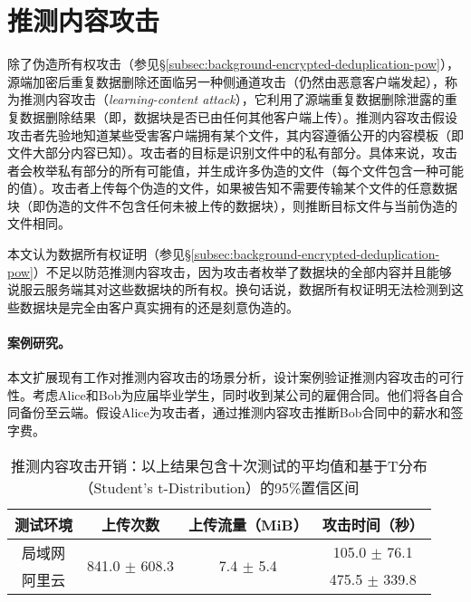 \section{推测内容攻击}
\label{sec:featurespy-attack}

除了伪造所有权攻击（参见\S\ref{subsec:background-encrypted-deduplication-pow}），源端加密后重复数据删除还面临另一种侧通道攻击（仍然由恶意客户端发起），称为推测内容攻击（{\em learning-content attack}）\cite{harnik2010side, zuo2018mitigating}，它利用了源端重复数据删除泄露的重复数据删除结果（即，数据块是否已由任何其他客户端上传）。推测内容攻击假设攻击者先验地知道某些受害客户端拥有某个文件，其内容遵循公开的内容模板（即文件大部分内容已知）。攻击者的目标是识别文件中的私有部分。具体来说，攻击者会枚举私有部分的所有可能值，并生成许多伪造的文件（每个文件包含一种可能的值）。攻击者上传每个伪造的文件，如果被告知不需要传输某个文件的任意数据块（即伪造的文件不包含任何未被上传的数据块），则推断目标文件与当前伪造的文件相同。

本文认为数据所有权证明\cite{halevi11}（参见\S\ref{subsec:background-encrypted-deduplication-pow}）不足以防范推测内容攻击，因为攻击者枚举了数据块的全部内容并且能够说服云服务端其对这些数据块的所有权。换句话说，数据所有权证明无法检测到这些数据块是完全由客户真实拥有的还是刻意伪造的。

\paragraph*{案例研究。}
本文扩展现有工作\cite{harnik2010side,zuo2018mitigating}对推测内容攻击的场景分析，设计案例验证推测内容攻击的可行性。考虑Alice和Bob为应届毕业学生，同时收到某公司的雇佣合同。他们将各自合同备份至云端。假设Alice为攻击者，通过推测内容攻击推断Bob合同中的薪水和签字费。

\begin{table}[!htb]
    \small
    \centering
    \begin{tabular}{@{}cccc@{}}
    \toprule
    测试环境 & 上传次数                            & 上传流量（MiB）                       & 攻击时间（秒）        \\ \midrule
    局域网  & \multirow{2}{*}{841.0 $\pm$ 608.3} & \multirow{2}{*}{7.4 $\pm$ 5.4} & 105.0 $\pm$ 76.1 \\
    阿里云  &                                 &                                 & 475.5 $\pm$ 339.8 \\
    \bottomrule
    \end{tabular}
    \caption{推测内容攻击开销：以上结果包含十次测试的平均值和基于T分布（Student's t-Distribution）的95\%置信区间}
    \label{tab:LRI-verify}
\end{table}

